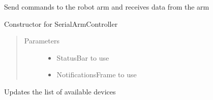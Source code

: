\documentclass[letterpaper,10pt,english,openany,oneside]{sphinxmanual}
\begin{document}
\begin{fulllineitems}
\label{\detokenize{src/serialarmcontroller:SerialArmController.SerialArmController}}
Send commands to the robot arm and receives data from the arm

\begin{fulllineitems}
\label{\detokenize{src/serialarmcontroller:SerialArmController.SerialArmController.__init__}}
Constructor for SerialArmController
\begin{quote}\begin{description}
\item[{Parameters}] \leavevmode\begin{itemize}
\item {} 
 \textendash{} StatusBar to use

\item {} 
 \textendash{} NotificationsFrame to use

\end{itemize}

\end{description}\end{quote}

\end{fulllineitems}


\begin{fulllineitems}
\label{\detokenize{src/serialarmcontroller:SerialArmController.SerialArmController.update_devs}}
Updates the list of available devices

\end{fulllineitems}



\end{fulllineitems}
\end{document}
